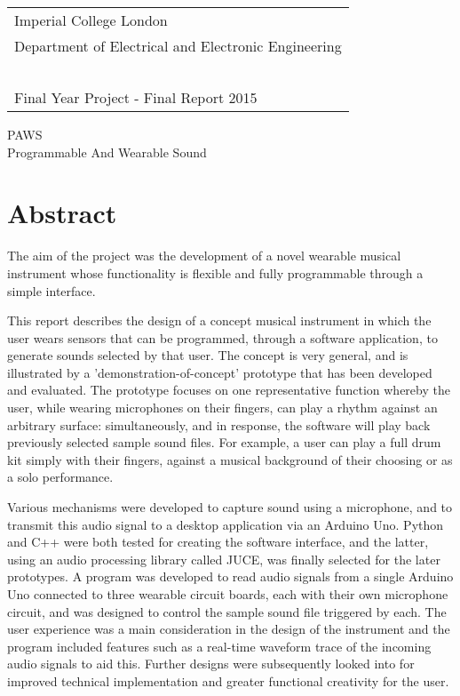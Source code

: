 \thispagestyle{empty}

\large
\begin{tabular}{|l}
Imperial College London\\
Department of Electrical and Electronic Engineering\\~\\
Final Year Project - Final Report 2015
\end{tabular}

\vspace{60 pt}
\begin{center}
\huge PAWS\\
\LARGE Programmable And Wearable Sound\\
\end{center}


\normalsize
\section*{Abstract} \label{Project Specification}

The aim of the project was the development of a novel wearable musical instrument whose functionality is flexible and fully programmable through a simple interface.

This report describes the design of a concept musical instrument in which the user wears sensors that can be programmed, through a software application, to generate sounds selected by that user. The concept is very general, and is illustrated by a 'demonstration-of-concept' prototype that has been developed and evaluated.  The prototype focuses on one representative function whereby the user, while wearing microphones on their fingers, can play a rhythm against an arbitrary surface: simultaneously, and in response, the software will play back previously selected sample sound files. For example, a user can play a full drum kit simply with their fingers, against a musical background of their choosing or as a solo performance.

Various mechanisms were developed to capture sound using a microphone, and to transmit this audio signal to a desktop application via an Arduino Uno. Python and C++ were both tested for creating the software interface, and the latter, using an audio processing library called JUCE, was finally selected for the later prototypes. A program was developed to read audio signals from a single Arduino Uno connected to three wearable circuit boards, each with their own microphone circuit, and was designed to control the sample sound file triggered by each. The user experience was a main consideration in the design of the instrument and the program included features such as a real-time waveform trace of the incoming audio signals to aid this. Further designs were subsequently looked into for improved technical implementation and greater functional creativity for the user.




